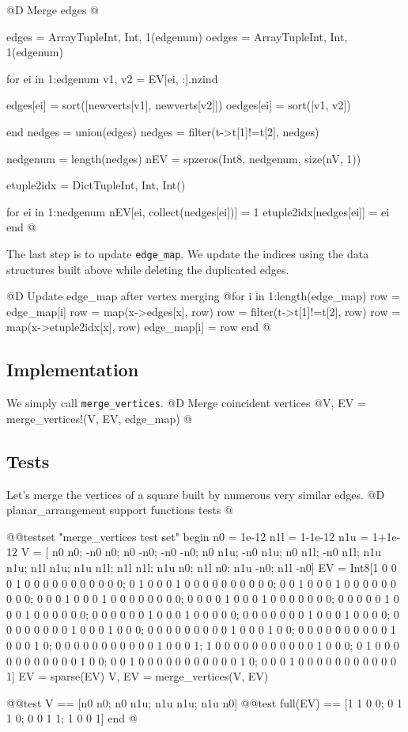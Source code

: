 @D Merge edges
@{edges = Array{Tuple{Int, Int}, 1}(edgenum)
oedges = Array{Tuple{Int, Int}, 1}(edgenum)

for ei in 1:edgenum
    v1, v2 = EV[ei, :].nzind
    
    edges[ei] = sort([newverts[v1], newverts[v2]])
    oedges[ei] = sort([v1, v2])

end
nedges = union(edges)
nedges = filter(t->t[1]!=t[2], nedges)

nedgenum = length(nedges)
nEV = spzeros(Int8, nedgenum, size(nV, 1))

etuple2idx = Dict{Tuple{Int, Int}, Int}()

for ei in 1:nedgenum
    nEV[ei, collect(nedges[ei])] = 1
    etuple2idx[nedges[ei]] = ei
end
@}

The last step is to update \texttt{edge\_map}.
We update the indices using the data structures
built above while deleting the duplicated edges.

@D Update edge\_map after vertex merging
@{for i in 1:length(edge_map)
    row = edge_map[i]
    row = map(x->edges[x], row)
    row = filter(t->t[1]!=t[2], row)
    row = map(x->etuple2idx[x], row)
    edge_map[i] = row
end
@}


\subsection{Implementation}
We simply call \texttt{merge\_vertices}.
@D Merge coincident vertices
@{V, EV = merge_vertices!(V, EV, edge_map)
@}
\subsection{Tests}
Let's merge the vertices of a square built by numerous
very similar edges.
@D planar\_arrangement support functions tests
@{@@testset "merge_vertices test set" begin
    n0 = 1e-12
    n1l = 1-1e-12
    n1u = 1+1e-12
    V = [ n0  n0; -n0  n0;  n0 -n0; -n0 -n0;
          n0 n1u; -n0 n1u;  n0 n1l; -n0 n1l;
         n1u n1u; n1l n1u; n1u n1l; n1l n1l;
         n1u  n0; n1l  n0; n1u -n0; n1l -n0]
    EV = Int8[1 0 0 0 1 0 0 0 0 0 0 0 0 0 0 0;
              0 1 0 0 0 1 0 0 0 0 0 0 0 0 0 0;
              0 0 1 0 0 0 1 0 0 0 0 0 0 0 0 0;
              0 0 0 1 0 0 0 1 0 0 0 0 0 0 0 0;
              0 0 0 0 1 0 0 0 1 0 0 0 0 0 0 0;
              0 0 0 0 0 1 0 0 0 1 0 0 0 0 0 0;
              0 0 0 0 0 0 1 0 0 0 1 0 0 0 0 0;
              0 0 0 0 0 0 0 1 0 0 0 1 0 0 0 0;
              0 0 0 0 0 0 0 0 1 0 0 0 1 0 0 0;
              0 0 0 0 0 0 0 0 0 1 0 0 0 1 0 0;
              0 0 0 0 0 0 0 0 0 0 1 0 0 0 1 0;
              0 0 0 0 0 0 0 0 0 0 0 1 0 0 0 1;
              1 0 0 0 0 0 0 0 0 0 0 0 1 0 0 0;
              0 1 0 0 0 0 0 0 0 0 0 0 0 1 0 0;
              0 0 1 0 0 0 0 0 0 0 0 0 0 0 1 0;
              0 0 0 1 0 0 0 0 0 0 0 0 0 0 0 1]
    EV = sparse(EV)
    V, EV = merge_vertices(V, EV)

    @@test V == [n0 n0; n0 n1u; n1u n1u; n1u n0]
    @@test full(EV) == [1 1 0 0;
                       0 1 1 0;
                       0 0 1 1;
                       1 0 0 1]
end
@}



